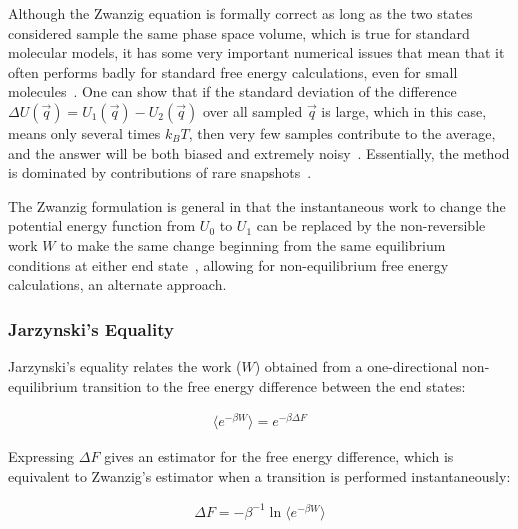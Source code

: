 \documentclass[9pt,bestpractices]{livecoms}
\begin{document}
Although the Zwanzig equation is formally correct as long as the two states considered sample the same phase space volume, which is true for standard molecular models, it has some very important numerical issues that mean that it often performs badly for standard free energy calculations, even for small molecules~\cite{shirts2005comparison,lu2003appropriate}. One can show that if the standard deviation of the difference $\Delta U(\vec{q}) = U_1(\vec{q})-U_2(\vec{q})$ over all sampled $\vec{q}$ is large, which in this case, means only several times $k_BT$, then very few samples contribute to the average, and the answer will be both biased and extremely noisy~\cite{lelievre2010free}. Essentially, the method is dominated by contributions of rare snapshots~\cite{jarzynski2006rare, wu2005phasespace, wu2005phasespacea}. 

The Zwanzig formulation is general in that the instantaneous work to change the potential energy function from $U_0$ to $U_1$ can be replaced by the non-reversible work $W$ to make the same change beginning from the same equilibrium conditions at either end state~\cite{jarzynski1997nonequilibrium,jarzynski1998equilibrium,crooks2000pathensemble}, allowing for non-equilibrium free energy calculations, an alternate approach. 

\subsubsection{Jarzynski's Equality}
Jarzynski's equality relates the work ($W$) obtained from a one-directional non-equilibrium transition to the free energy difference between the end states:

\begin{eqnarray}
\langle e^{-\beta W} \rangle =e^{-\beta\Delta F}
\end{eqnarray}\label{eqn.jarzynski}

Expressing $\Delta F$ gives an estimator for the free energy difference, which is equivalent to Zwanzig's estimator when a transition is performed instantaneously:

\begin{eqnarray}
\Delta F = -\beta^{-1} \ln\langle e^{-\beta W} \rangle
\end{eqnarray}\label{eqn.jarzynski_estimator}
\end{document}
